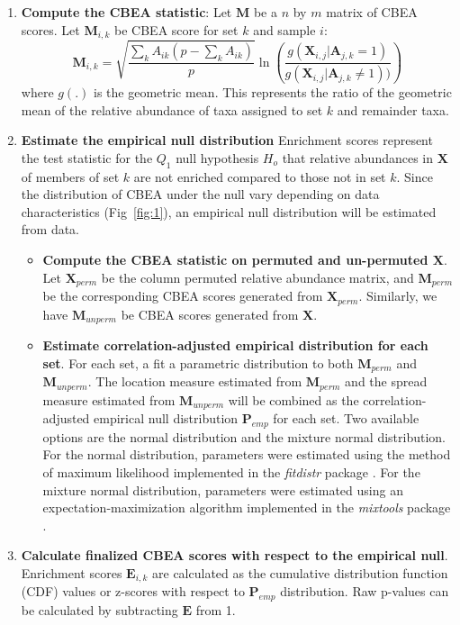 \documentclass[10pt,letterpaper]{article}
\begin{document}
\begin{enumerate}
    \item \textbf{Compute the CBEA statistic}: Let $\mathbf{M}$ be a $n$ by $m$ matrix of CBEA scores. Let $\mathbf{M}_{i,k}$ be CBEA score for set $k$ and sample $i$:   
    \begin{equation}\label{main_eq}
        \mathbf{M}_{i,k} = \sqrt{\frac{\sum_k A_{ik}(p - \sum_k A_{ik})}{p}} \ln \left( \frac{g(\mathbf{X}_{i,j}|\mathbf{A}_{j,k} = 1)}{g(\mathbf{X}_{i,j}|\mathbf{A}_{j,k} \neq 1))} \right)
    \end{equation}
    where $g(.)$ is the geometric mean. This represents the ratio of the geometric mean of the relative abundance of taxa assigned to set $k$ and remainder taxa. 
    \item \textbf{Estimate the empirical null distribution} Enrichment scores represent the test statistic for the $Q_1$ null hypothesis $H_o$ that relative abundances in $\mathbf{X}$ of members of set $k$ are not enriched compared to those not in set $k$. Since the distribution of CBEA under the null vary depending on data characteristics (Fig~\ref{fig:1}), an empirical null distribution will be estimated from data.
    \begin{itemize}
        \item \textbf{Compute the CBEA statistic on permuted and un-permuted $\mathbf{X}$}.  Let $\mathbf{X}_{perm}$ be the column permuted relative abundance matrix, and $\mathbf{M}_{perm}$ be the corresponding CBEA scores generated from $\mathbf{X}_{perm}$. Similarly, we have $\mathbf{M}_{unperm}$ be CBEA scores generated from $\mathbf{X}$.
        \item \textbf{Estimate correlation-adjusted empirical distribution for each set}. For each set, a fit a parametric distribution to both $\mathbf{M}_{perm}$ and $\mathbf{M}_{unperm}$. The location measure estimated from $\mathbf{M}_{perm}$ and the spread measure estimated from $\mathbf{M}_{unperm}$ will be combined as the correlation-adjusted empirical null distribution $\mathbf{P}_{emp}$ for each set. Two available options are the normal distribution and the mixture normal distribution. For the normal distribution, parameters were estimated using the method of maximum likelihood implemented in the \emph{fitdistr} package \cite{delignette-muller2015}. For the mixture normal distribution, parameters were estimated using an expectation-maximization algorithm implemented in the \emph{mixtools} package \cite{benaglia2009}. 
    \end{itemize}
    \item \textbf{Calculate finalized CBEA scores with respect to the empirical null}. Enrichment scores $\mathbf{E}_{i,k}$ are calculated as the cumulative distribution function (CDF) values or z-scores with respect to $\mathbf{P}_{emp}$ distribution. Raw p-values can be calculated by subtracting $\mathbf{E}$ from 1. 
\end{enumerate}
\end{document}
